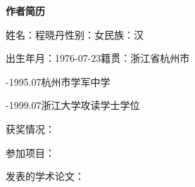 {
\newpage
{}
{}
\begin{center}
  \bfseries \vspace{0.5ex}作者简历\vspace{0.5ex}
\end{center}

\noindent 姓名：程晓丹\hspace{1em}性别：女\hspace{1em}民族：汉\par
\noindent 出生年月：1976-07-23\hspace{1em}籍贯：浙江省杭州市\par\par
{}-1995.07\hspace{2em}杭州市学军中学\par
{}-1999.07\hspace{2em}浙江大学攻读学士学位\par
\noindent 获奖情况：\par
\noindent 参加项目：\par
\noindent 发表的学术论文：\par
}
